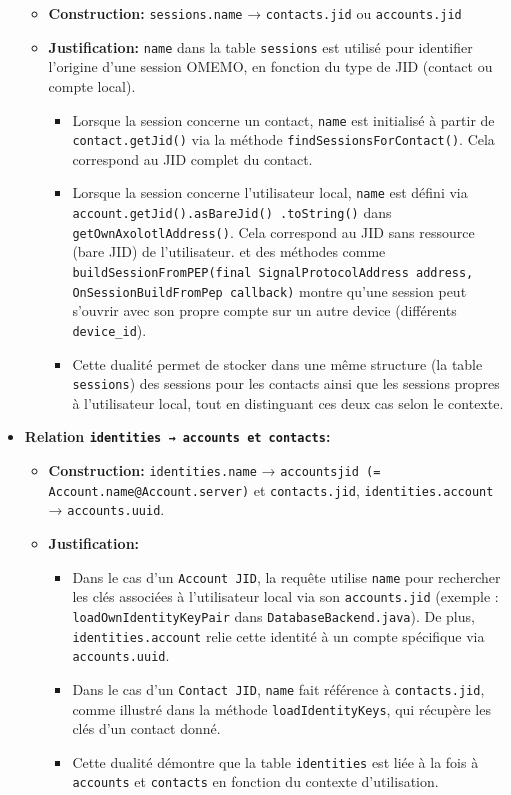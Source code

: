 \documentclass[a4paper,11pt]{article}
\begin{document}
\begin{itemize}
\begin{itemize}
        \item \textbf{Construction:} \texttt{sessions.name} → \texttt{contacts.jid} ou \texttt{accounts.jid}
        \item \textbf{Justification:} \texttt{name} dans la table \texttt{sessions} est utilisé pour identifier l'origine d'une session OMEMO, en fonction du type de JID (contact ou compte local).
        \begin{itemize}
            \item Lorsque la session concerne un contact, \texttt{name} est initialisé à partir de \texttt{contact.getJid()} via la méthode \texttt{findSessionsForContact()}. Cela correspond au JID complet du contact.
            \item Lorsque la session concerne l'utilisateur local, \texttt{name} est défini via 
            \texttt{account.getJid().asBareJid()
            .toString()} dans \texttt{getOwnAxolotlAddress()}. Cela correspond au JID sans ressource (bare JID) de l'utilisateur. et des méthodes comme \texttt{buildSessionFromPEP(final SignalProtocolAddress address, OnSessionBuildFromPep callback)} montre qu'une session peut s'ouvrir avec son propre compte sur un autre device (différents \texttt{device\_id}).
            \item Cette dualité permet de stocker dans une même structure (la table \texttt{sessions}) des sessions pour les contacts ainsi que les sessions propres à l'utilisateur local, tout en distinguant ces deux cas selon le contexte.
        \end{itemize}
    \end{itemize}
        \item \textbf{Relation \texttt{identities → accounts et contacts}:}
\begin{itemize}
    \item \textbf{Construction:} \texttt{identities.name} → \texttt{accountsjid (= Account.name@Account.server)} et \texttt{contacts.jid}, \texttt{identities.account} → \texttt{accounts.uuid}.
    \item \textbf{Justification:} 
    \begin{itemize}
        \item Dans le cas d’un \texttt{Account JID}, la requête utilise \texttt{name} pour rechercher les clés associées à l'utilisateur local via son \texttt{accounts.jid} (exemple : \texttt{loadOwnIdentityKeyPair} dans \texttt{DatabaseBackend.java}). De plus, \texttt{identities.account} relie cette identité à un compte spécifique via \texttt{accounts.uuid}.
        \item Dans le cas d’un \texttt{Contact JID}, \texttt{name} fait référence à \texttt{contacts.jid}, comme illustré dans la méthode \texttt{loadIdentityKeys}, qui récupère les clés d’un contact donné.
        \item Cette dualité démontre que la table \texttt{identities} est liée à la fois à \texttt{accounts} et \texttt{contacts} en fonction du contexte d’utilisation.
    \end{itemize}
\end{itemize}

    \end{itemize}
\end{document}
